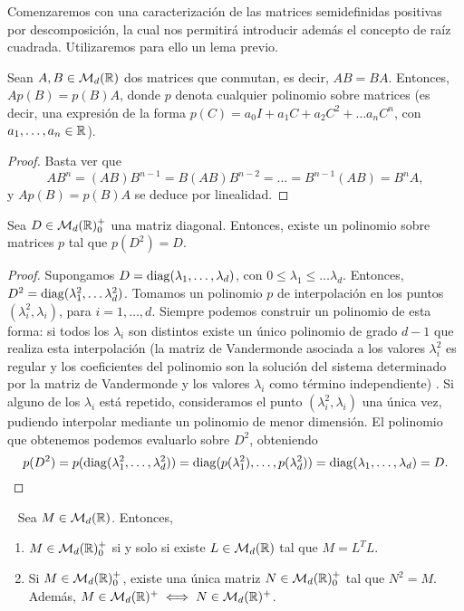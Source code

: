 Comenzaremos con una caracterización de las matrices semidefinidas positivas por descomposición, la cual nos permitirá introducir además el concepto de raíz cuadrada. Utilizaremos para ello un lema previo.

\begin{lem} \label{lem:poly_conmute}
    Sean $A, B \in \mathcal{M}_d(\mathbb{R})$ dos matrices que conmutan, es decir, $AB = BA$. Entonces, $Ap(B) = p(B)A$, donde $p$ denota cualquier polinomio sobre matrices (es decir, una expresión de la forma $p(C) = a_0I + a_1C + a_2C^2 + \dots a_nC^n$, con $a_1,\dots,a_n \in \mathbb{R}$).
\end{lem}
\begin{proof}
    Basta ver que
    \[AB^n = (AB)B^{n-1} = B(AB)B^{n-2} = \dots = B^{n-1}(AB) = B^nA, \]
    y $Ap(B) = p(B)A$ se deduce por linealidad.
\end{proof}

\begin{lem} \label{lem:poly_diag_sqrt}
    Sea $D \in \mathcal{M}_d(\mathbb{R})^+_0$ una matriz diagonal. Entonces, existe un polinomio sobre matrices $p$ tal que $p(D^2) = D$.
\end{lem}
\begin{proof}
    Supongamos $D = \operatorname{diag}(\lambda_1,\dots,\lambda_d)$, con $0 \le \lambda_1 \le \dots \lambda_d$. Entonces, $D^2 = \operatorname{diag}(\lambda_1^2,\dots\lambda_d^2)$. Tomamos un polinomio $p$ de interpolación en los puntos $(\lambda_i^2,\lambda_i)$, para $i = 1,\dots,d$. Siempre podemos construir un polinomio de esta forma: si todos los $\lambda_i$ son distintos existe un único polinomio de grado $d-1$ que realiza esta interpolación (la matriz de Vandermonde asociada a los valores $\lambda_i^2$ es regular y los coeficientes del polinomio son la solución del sistema determinado por la matriz de Vandermonde y los valores $\lambda_i$ como término independiente) . Si alguno de los $\lambda_i$ está repetido, consideramos el punto $(\lambda_i^2, \lambda_i)$ una única vez, pudiendo interpolar mediante un polinomio de menor dimensión. El polinomio que obtenemos podemos evaluarlo sobre $D^2$, obteniendo
    \[p(D^2) = p(\operatorname{diag}(\lambda_1^2,\dots,\lambda_d^2)) = \operatorname{diag}(p(\lambda_1^2),\dots,p(\lambda_d^2)) = \operatorname{diag}(\lambda_1,\dots,\lambda_d) = D. \]
\end{proof}

\begin{thm}~ \label{thm:decomp_sqrt}
    Sea $M \in \mathcal{M}_d(\mathbb{R})$. Entonces,
    \begin{enumerate}
        \item $M \in \mathcal{M}_d(\mathbb{R})^+_0$ si y solo si existe $L \in \mathcal{M}_d(\mathbb{R})$ tal que $M = L^T L$.
        \item Si $M \in \mathcal{M}_d(\mathbb{R})^+_0$, existe una única matriz $N \in \mathcal{M}_d(\mathbb{R})^+_0$ tal que $N^2 = M$. Además, $M \in \mathcal{M}_d(\mathbb{R})^+ \iff N \in \mathcal{M}_d(\mathbb{R})^+$.
    \end{enumerate}
\end{thm}


